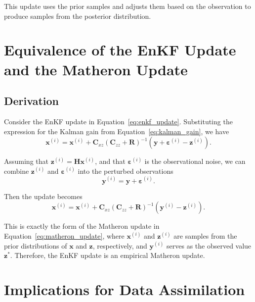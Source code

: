 \documentclass{article}
\theoremstyle{plain}
\begin{document}
This update uses the prior samples and adjusts them based on the observation to produce samples from the posterior distribution.

\section{Equivalence of the EnKF Update and the Matheron Update}

\subsection{Derivation}

Consider the EnKF update in Equation~\eqref{eq:enkf_update}. Substituting the expression for the Kalman gain from Equation~\eqref{eq:kalman_gain}, we have
\begin{equation}
    \mathbf{x}^{(i)} = \mathbf{x}^{(i)} + \mathbf{C}_{xz} \left( \mathbf{C}_{zz} + \mathbf{R} \right)^{-1} \left( \mathbf{y} + \boldsymbol{\varepsilon}^{(i)} - \mathbf{z}^{(i)} \right).
    \label{eq:enkf_update_substituted}
\end{equation}

Assuming that $\mathbf{z}^{(i)} = \mathbf{H} \mathbf{x}^{(i)}$, and that $\boldsymbol{\varepsilon}^{(i)}$ is the observational noise, we can combine $\mathbf{z}^{(i)}$ and $\boldsymbol{\varepsilon}^{(i)}$ into the perturbed observations
\begin{equation}
    \mathbf{y}^{(i)} = \mathbf{y} + \boldsymbol{\varepsilon}^{(i)}.
\end{equation}

Then the update becomes
\begin{equation}
    \mathbf{x}^{(i)} = \mathbf{x}^{(i)} + \mathbf{C}_{xz} \left( \mathbf{C}_{zz} + \mathbf{R} \right)^{-1} \left( \mathbf{y}^{(i)} - \mathbf{z}^{(i)} \right).
    \label{eq:enkf_matheron}
\end{equation}

This is exactly the form of the Matheron update in Equation~\eqref{eq:matheron_update}, where $\mathbf{x}^{(i)}$ and $\mathbf{z}^{(i)}$ are samples from the prior distributions of $\mathbf{x}$ and $\mathbf{z}$, respectively, and $\mathbf{y}^{(i)}$ serves as the observed value $\mathbf{z}^*$. Therefore, the EnKF update is an empirical Matheron update.

\section{Implications for Data Assimilation}
\end{document}
